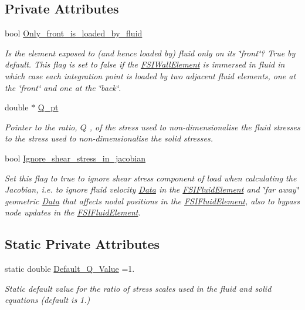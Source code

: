 \subsection*{Private Attributes}
\begin{DoxyCompactItemize}
\item 
bool \hyperlink{classoomph_1_1FSIWallElement_afaa82ab6ab3c4813c3d5342d3de91960}{Only\+\_\+front\+\_\+is\+\_\+loaded\+\_\+by\+\_\+fluid}
\begin{DoxyCompactList}\small\item\em Is the element exposed to (and hence loaded by) fluid only on its \char`\"{}front\char`\"{}? True by default. This flag is set to false if the \hyperlink{classoomph_1_1FSIWallElement}{F\+S\+I\+Wall\+Element} is immersed in fluid in which case each integration point is loaded by two adjacent fluid elements, one at the \char`\"{}front\char`\"{} and one at the \char`\"{}back\char`\"{}. \end{DoxyCompactList}\item 
double $\ast$ \hyperlink{classoomph_1_1FSIWallElement_ab476ed3f14e4ffe9711d597b2703a3bc}{Q\+\_\+pt}
\begin{DoxyCompactList}\small\item\em Pointer to the ratio, $ Q $ , of the stress used to non-\/dimensionalise the fluid stresses to the stress used to non-\/dimensionalise the solid stresses. \end{DoxyCompactList}\item 
bool \hyperlink{classoomph_1_1FSIWallElement_a5eb4d9f6c1d9c7745b4313a0a832fbb0}{Ignore\+\_\+shear\+\_\+stress\+\_\+in\+\_\+jacobian}
\begin{DoxyCompactList}\small\item\em Set this flag to true to ignore shear stress component of load when calculating the Jacobian, i.\+e. to ignore fluid velocity \hyperlink{classoomph_1_1Data}{Data} in the \hyperlink{classoomph_1_1FSIFluidElement}{F\+S\+I\+Fluid\+Element} and \char`\"{}far away\char`\"{} geometric \hyperlink{classoomph_1_1Data}{Data} that affects nodal positions in the \hyperlink{classoomph_1_1FSIFluidElement}{F\+S\+I\+Fluid\+Element}, also to bypass node updates in the \hyperlink{classoomph_1_1FSIFluidElement}{F\+S\+I\+Fluid\+Element}. \end{DoxyCompactList}\end{DoxyCompactItemize}
\subsection*{Static Private Attributes}
\begin{DoxyCompactItemize}
\item 
static double \hyperlink{classoomph_1_1FSIWallElement_ac55ce8829f73fe16f4245fa7c0f2cd54}{Default\+\_\+\+Q\+\_\+\+Value} =1.
\begin{DoxyCompactList}\small\item\em Static default value for the ratio of stress scales used in the fluid and solid equations (default is 1.) \end{DoxyCompactList}\end{DoxyCompactItemize}
